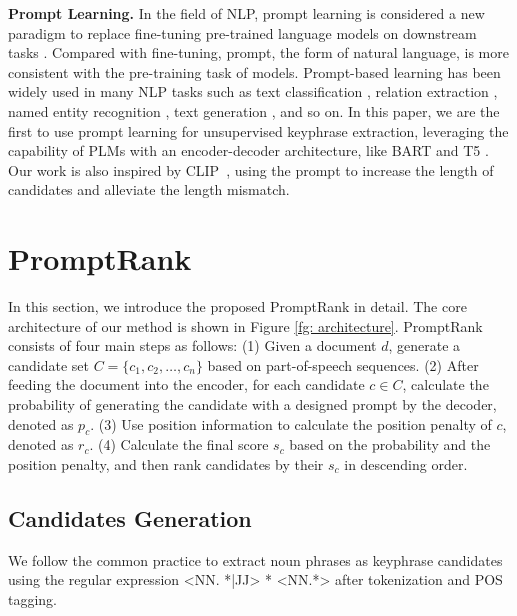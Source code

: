 \documentclass[11pt]{article}
\begin{document}
{\bf Prompt Learning.} In the field of NLP, prompt learning is considered a new paradigm to replace fine-tuning pre-trained language models on downstream tasks \cite{liu2021pre}. Compared with fine-tuning, prompt, the form of natural language, is more consistent with the pre-training task of models. Prompt-based learning has been widely used in many NLP tasks such as text classification \cite{gao-etal-2021-making, schick-schutze-2021-exploiting}, relation extraction \cite{chen2022knowprompt}, named entity recognition \cite{cui-etal-2021-template}, text generation \cite{li-liang-2021-prefix}, and so on. In this paper, we are the first to use prompt learning for unsupervised keyphrase extraction, leveraging the capability of PLMs with an encoder-decoder architecture, like BART \cite{lewis-etal-2020-bart} and T5 \cite{raffel2020exploring}. Our work is also inspired by CLIP~\cite{clip}, using the prompt to increase the length of candidates and alleviate the length mismatch. 






\section{PromptRank}



In this section, we introduce the proposed PromptRank in detail. The core architecture of our method is shown in Figure \ref{fg: architecture}. PromptRank consists of four main steps as follows: (1) Given a document $d$, generate a candidate set $C = \{c_{1}, c_{2}, \ldots, c_{n}\}$ based on part-of-speech sequences. (2) After feeding the document into the encoder, for each candidate $c \in C$, calculate the probability of generating the candidate with a designed prompt by the decoder, denoted as $p_{c}$. (3) Use position information to calculate the position penalty of $c$, denoted as $r_{c}$. (4) Calculate the final score $s_{c}$ based on the probability and the position penalty, and then rank candidates by their $s_{c}$ in descending order.

\subsection{Candidates Generation}
\label{section: 3.1}

We follow the common practice \cite{bennani-smires-etal-2018-simple, 8954611, zhang-etal-2022-mderank} to extract noun phrases as keyphrase candidates using the regular expression <NN. *|JJ> * <NN.*> after tokenization and POS tagging.
\end{document}
